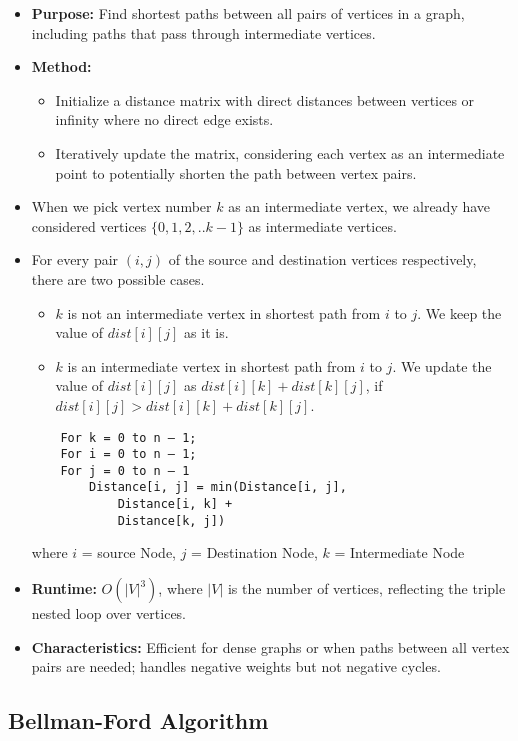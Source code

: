 \documentclass[landscape,7pt]{extarticle}
\begin{document}
\begin{multicols*}{3}
\begin{itemize}
    \item \textbf{Purpose:} Find shortest paths between all pairs of vertices in a graph, including paths that pass through intermediate vertices.
    \item \textbf{Method:}
    \begin{itemize}
        \item Initialize a distance matrix with direct distances between vertices or infinity where no direct edge exists.
        \item Iteratively update the matrix, considering each vertex as an intermediate point to potentially shorten the path between vertex pairs.
    \end{itemize}
    \item When we pick vertex number $k$ as an intermediate vertex, we already have considered vertices $\{0, 1, 2, .. k-1\}$ as intermediate vertices.
    \item For every pair $(i, j)$ of the source and destination vertices respectively, there are two possible cases.
    \begin{itemize}
        \item $k$ is not an intermediate vertex in shortest path from $i$ to $j$. We keep the value of $dist[i][j]$ as it is.
        \item $k$ is an intermediate vertex in shortest path from $i$ to $j$. We update the value of $dist[i][j]$ as $dist[i][k] + dist[k][j]$, if $dist[i][j] > dist[i][k] + dist[k][j]$.
    \end{itemize}
    
    \begin{verbatim}
    For k = 0 to n – 1; 
    For i = 0 to n – 1; 
    For j = 0 to n – 1
        Distance[i, j] = min(Distance[i, j], 
            Distance[i, k] + 
            Distance[k, j])
    \end{verbatim}
    
    where $i$ = source Node, $j$ = Destination Node, $k$ = Intermediate Node
    \item \textbf{Runtime:} $O(|V|^3)$, where $|V|$ is the number of vertices, reflecting the triple nested loop over vertices.
    \item \textbf{Characteristics:} Efficient for dense graphs or when paths between all vertex pairs are needed; handles negative weights but not negative cycles.
\end{itemize}

\subsection*{Bellman-Ford Algorithm}


\end{multicols*}
\end{document}
